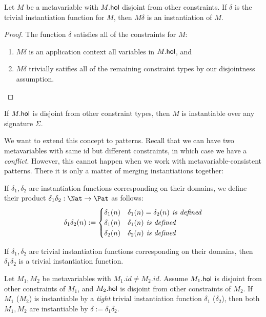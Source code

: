 \documentclass{mgr}
\begin{document}
\begin{proposition*}
  \label{prop:trivial_inst}
  Let $M$ be a metavariable with $M.\mathsf{hol}$ disjoint from other constraints.
  If $\delta$ is the trivial instantiation function for $M$, then $M\delta$ is an instantiation of $M$.
  \begin{proof}
    The function $\delta$ satisfies all of the constraints for $M$:
    \begin{enumerate}
      \item $M\delta$ is an application context \wrt all variables in $M.\mathsf{hol}$, and
      \item $M\delta$ trivially satifies all of the remaining constraint types by our disjointness assumption.
    \end{enumerate}
  \end{proof}
\end{proposition*}
\begin{corollary}
  If $M.\mathsf{hol}$ is disjoint from other constraint types, then $M$ is instantiable over any signature $\Sigma$.
\end{corollary}

We want to extend this concept to patterns.
Recall that we can have two metavariables with same id but different constraints, in which case we have a \emph{conflict}.
However, this cannot happen when we work with metavariable-consistent patterns.
There it is only a matter of merging instantiations together:
\begin{definition}[Products]
  If $\delta_1, \delta_2$ are instantiation functions corresponding on their domains, we define their product $\delta_1 \delta_2 : \Nat \to \Pat$ as follows: \[\delta_1 \delta_2 (n) :=
    \begin{cases}
      \delta_1(n)&\delta_1(n) = \delta_2(n)\emph{ is defined}\\
      \delta_1(n)&\delta_1(n)\emph{ is defined}\\
      \delta_2(n)&\delta_2(n)\emph{ is defined}
    \end{cases}\]
\end{definition}
\begin{proposition}
  \label{prop:product_vs_trivial}
  If $\delta_1, \delta_2$ are trivial instantiation functions corresponding on their domains, then $\delta_1 \delta_2$ is a trivial instantiation function.
\end{proposition}
\begin{proposition*}
  \label{prop:product}
  Let $M_1, M_2$ be metavariables with $M_1.id \neq M_2.id$.
  Assume $M_1.\mathsf{hol}$ is disjoint from other constraints of $M_1$, and $M_2.\mathsf{hol}$ is disjoint from other constraints of $M_2$.
  If $M_1$ ($M_2$) is instantiable by a \emph{tight} trivial instantiation function $\delta_1$ ($\delta_2$), then both $M_1, M_2$ are instantiable by $\delta := \delta_1 \delta_2$.
\end{proposition*}
\end{document}
